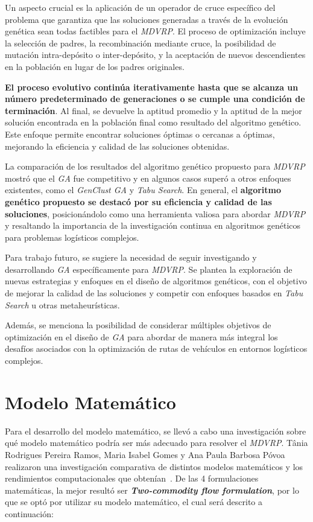 \documentclass[letter, 10pt]{article}
\begin{document}
Un aspecto crucial es la aplicación de un operador de cruce específico del problema que garantiza que las soluciones generadas a través de la evolución genética sean todas factibles para el \textit{MDVRP}. El proceso de optimización incluye la selección de padres, la recombinación mediante cruce, la posibilidad de mutación intra-depósito o inter-depósito, y la aceptación de nuevos descendientes en la población en lugar de los padres originales.

\textbf{El proceso evolutivo continúa iterativamente hasta que se alcanza un número predeterminado de generaciones o se cumple una condición de terminación}. Al final, se devuelve la aptitud promedio y la aptitud de la mejor solución encontrada en la población final como resultado del algoritmo genético. Este enfoque permite encontrar soluciones óptimas o cercanas a óptimas, mejorando la eficiencia y calidad de las soluciones obtenidas.

La comparación de los resultados del algoritmo genético propuesto para \textit{MDVRP} mostró que el \textit{GA} fue competitivo y en algunos casos superó a otros enfoques existentes, como el \textit{GenClust GA} y \textit{Tabu Search}. En general, el \textbf{algoritmo genético propuesto se destacó por su eficiencia y calidad de las soluciones}, posicionándolo como una herramienta valiosa para abordar \textit{MDVRP} y resaltando la importancia de la investigación continua en algoritmos genéticos para problemas logísticos complejos.

Para trabajo futuro, se sugiere la necesidad de seguir investigando y desarrollando \textit{GA} específicamente para \textit{MDVRP}. Se plantea la exploración de nuevas estrategias y enfoques en el diseño de algoritmos genéticos, con el objetivo de mejorar la calidad de las soluciones y competir con enfoques basados en \textit{Tabu Search} u otras metaheurísticas.

Además, se menciona la posibilidad de considerar múltiples objetivos de optimización en el diseño de \textit{GA} para abordar de manera más integral los desafíos asociados con la optimización de rutas de vehículos en entornos logísticos complejos.

\section{Modelo Matemático}

Para el desarrollo del modelo matemático, se llevó a cabo una investigación sobre qué modelo matemático podría ser más adecuado para resolver el \textit{MDVRP}. Tânia Rodrigues Pereira Ramos, Maria Isabel Gomes y Ana Paula Barbosa Póvoa realizaron una investigación comparativa de distintos modelos matemáticos y los rendimientos computacionales que obtenían~\cite{MathematicalModel}. De las 4 formulaciones matemáticas, la mejor resultó ser \textbf{\textit{Two-commodity flow formulation}}, por lo que se optó por utilizar su modelo matemático, el cual será descrito a continuación:
\end{document}

